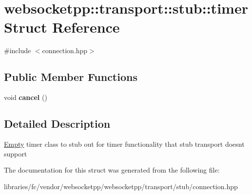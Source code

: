 \hypertarget{structwebsocketpp_1_1transport_1_1stub_1_1timer}{}\section{websocketpp\+:\+:transport\+:\+:stub\+:\+:timer Struct Reference}
\label{structwebsocketpp_1_1transport_1_1stub_1_1timer}


{\ttfamily \#include $<$connection.\+hpp$>$}

\subsection*{Public Member Functions}
\begin{DoxyCompactItemize}
\item 
\mbox{\label{structwebsocketpp_1_1transport_1_1stub_1_1timer_a7c193cb8757d756bb0510a8e1147e9c7}} 
void {\bfseries cancel} ()
\end{DoxyCompactItemize}


\subsection{Detailed Description}
\mbox{\hyperlink{class_empty}{Empty}} timer class to stub out for timer functionality that stub transport doesn\textquotesingle{}t support 

The documentation for this struct was generated from the following file\+:\begin{DoxyCompactItemize}
\item 
libraries/fc/vendor/websocketpp/websocketpp/transport/stub/connection.\+hpp\end{DoxyCompactItemize}
